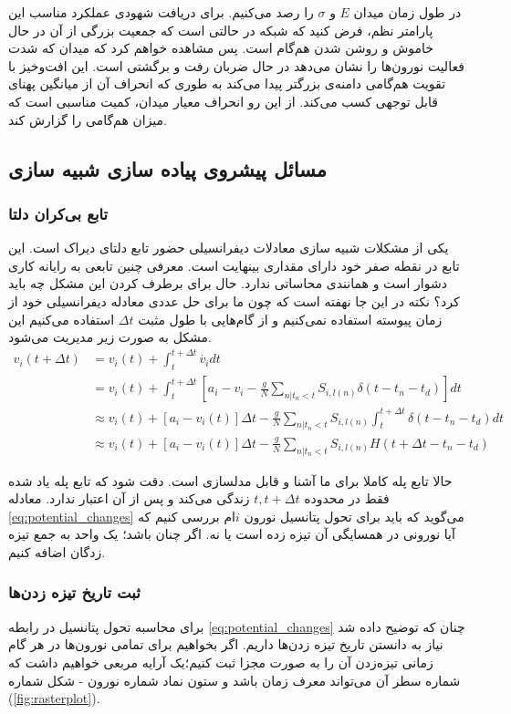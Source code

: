 در طول زمان میدان $E$ و $\sigma$ را رصد می‌کنیم. برای دریافت شهودی عملکرد مناسب این پارامتر نظم، فرض کنید که شبکه در حالتی است که جمعیت بزرگی از آن در حال خاموش و روشن شدن هم‌گام است. پس مشاهده خواهم کرد که میدان که شدت فعالیت نورون‌ها را نشان می‌دهد در حال ضربان رفت و برگشتی است. این افت‌وخیز با تقویت هم‌گامی دامنه‌ی بزرگتر پیدا می‌کند به طوری که انحراف آن از میانگین پهنای قابل توجهی کسب می‌کند. از این رو انحراف معیار میدان، کمیت مناسبی است که میزان هم‌گامی را گزارش کند.\\

\subsection{مسائل پیشروی پیاده سازی شبیه سازی}
\subsubsection{تابع بی‌کران دلتا}
یکی از مشکلات شبیه سازی معادلات دیفرانسیلی حضور تابع دلتای دیراک است. این تابع در نقطه صفر خود دارای مقداری بینهایت است. معرفی چنین تابعی به رایانه کاری دشوار است و همانندی محاساتی ندارد. حال برای برطرف کردن این مشکل چه باید کرد؟ نکته در این جا نهفته است که چون ما برای حل عددی معادله دیفرانسیلی خود از زمان پیوسته استفاده نمی‌کنیم و از گام‌هایی با طول مثبت $\Delta t$ استفاده می‌کنیم این مشکل به صورت زیر مدیریت می‌شود.
\begin{align}
	v_{i}(t+\Delta t) &= v_{i}(t) + \int_{t}^{t+\Delta t} \dot{v_i}  dt \\
	&= v_{i}(t) + \int_{t}^{t+\Delta t} \left[ a_i - v_i - \frac{g}{N} \sum_{n|t_n<t} S_{i,l(n)} \delta(t - t_n - t_d)  \right]   dt \\
	&\approx v_{i}(t) +  \left[ a_i - v_i(t) \right] \Delta t - \frac{g}{N} \sum_{n|t_n<t} S_{i,l(n)} \int_{t}^{t+\Delta t} \delta(t - t_n - t_d) dt  \\
	&\approx v_{i}(t) +  \left[ a_i - v_i(t) \right] \Delta t - \frac{g}{N} \sum_{n|t_n<t} S_{i,l(n)} H(t + \Delta t- t_n - t_d) \label{eq:potential_changes}
\end{align}

حالا تابع پله کاملا برای ما آشنا و قابل مدلسازی است. دقت شود که تابع پله یاد شده فقط در محدوده $t, t+\Delta t$ زندگی می‌کند و پس از آن اعتبار ندارد. معادله \ref{eq:potential_changes}  می‌گوید که باید برای تحول پتانسیل نورون $i$ام بررسی کنیم که آیا نورونی در همسایگی آن تیزه زده است یا نه. اگر چنان باشد؛ یک واحد به جمع تیزه زدگان اضافه کنیم.


\subsubsection{ثبت تاریخ تیزه زدن‌ها}
برای محاسبه تحول پتانسیل در رابطه \ref{eq:potential_changes} چنان که توضیح داده شد نیاز به دانستن تاریخ تیزه زدن‌ها داریم. اگر بخواهیم برای تمامی نورون‌ها در هر گام زمانی تیزه‌زدن آن را به صورت مجزا ثبت کنیم؛یک آرایه مربعی خواهیم داشت که شماره سطر آن می‌تواند معرف زمان باشد و ستون نماد شماره نورون - شکل شماره (\ref{fig:rasterplot}).\\

